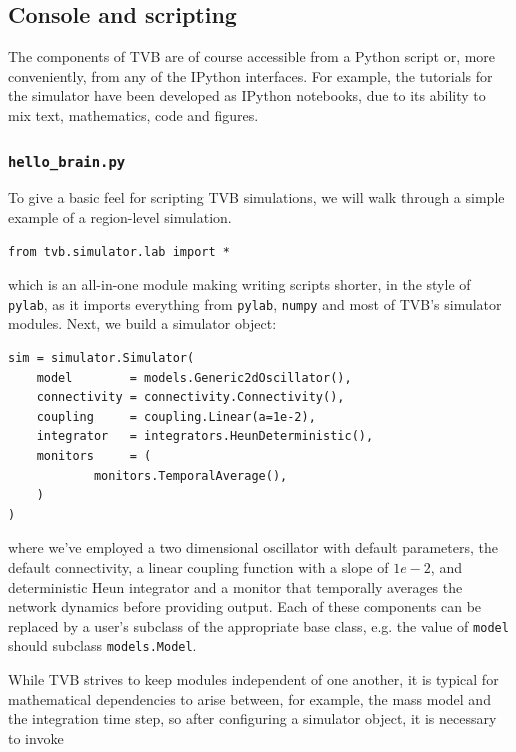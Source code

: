 \documentclass{bioinfo}
\begin{document}
\subsection{Console and scripting}

The components of TVB are of course accessible from a Python
script or, more conveniently, from any of the IPython interfaces.
For example, the tutorials for the simulator have been developed
as IPython notebooks, due to its ability to mix text, mathematics,
code and figures. 

\subsubsection{\texttt{hello\_brain.py}}

To give a basic feel for scripting TVB simulations, we will 
walk through a simple example of a region-level simulation.

\begin{lstlisting}
from tvb.simulator.lab import *
\end{lstlisting}

\noindent which is an all-in-one module making writing scripts
shorter, in the style of \texttt{pylab}, as it imports everything
from \texttt{pylab}, \texttt{numpy} and most of TVB's simulator
modules. Next, we build a simulator object:

\begin{lstlisting}
sim = simulator.Simulator(
    model        = models.Generic2dOscillator(), 
    connectivity = connectivity.Connectivity(),
    coupling     = coupling.Linear(a=1e-2),
    integrator   = integrators.HeunDeterministic(),
    monitors     = (
            monitors.TemporalAverage(), 
    )
)
\end{lstlisting}

\noindent where we've employed a two dimensional oscillator
with default parameters, the default connectivity, a linear 
coupling function with a slope of $1e-2$, and deterministic
Heun integrator and a monitor that temporally averages the 
network dynamics before providing output. Each of these
components can be replaced by a user's subclass of the
appropriate base class, e.g. the value of \texttt{model}
should subclass \texttt{models.Model}.

While TVB strives to keep modules independent of one another,
it is typical for mathematical dependencies to arise between, 
for example, the mass model and the integration time step, so
after configuring a simulator object, it is necessary to invoke
\end{document}
